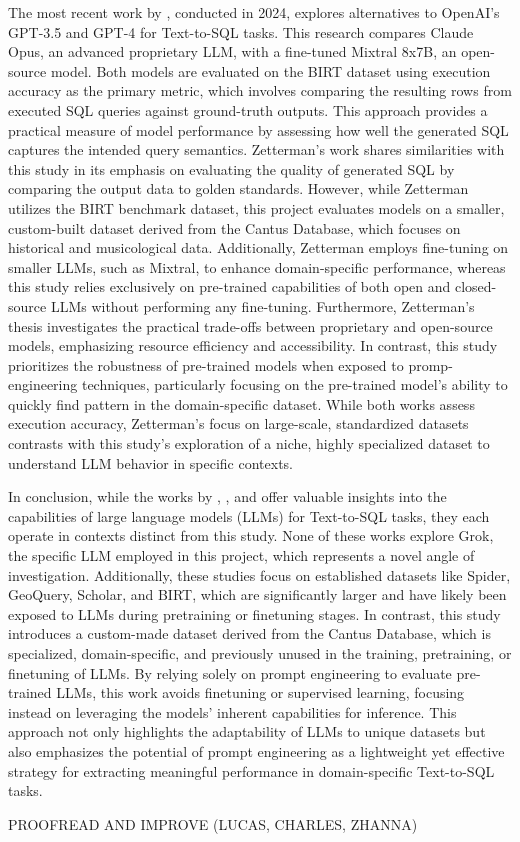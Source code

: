The most recent work by \cite{zetterman2024text2sql}, conducted in 2024, explores alternatives to OpenAI's GPT-3.5 and GPT-4 for Text-to-SQL tasks. This research compares Claude Opus, an advanced proprietary LLM, with a fine-tuned Mixtral 8x7B, an open-source model. Both models are evaluated on the BIRT dataset using execution accuracy as the primary metric, which involves comparing the resulting rows from executed SQL queries against ground-truth outputs. This approach provides a practical measure of model performance by assessing how well the generated SQL captures the intended query semantics. Zetterman’s work shares similarities with this study in its emphasis on evaluating the quality of generated SQL by comparing the output data to golden standards. However, while Zetterman utilizes the BIRT benchmark dataset, this project evaluates models on a smaller, custom-built dataset derived from the Cantus Database, which focuses on historical and musicological data. Additionally, Zetterman employs fine-tuning on smaller LLMs, such as Mixtral, to enhance domain-specific performance, whereas this study relies exclusively on pre-trained capabilities of both open and closed-source LLMs without performing any fine-tuning. Furthermore, Zetterman’s thesis investigates the practical trade-offs between proprietary and open-source models, emphasizing resource efficiency and accessibility. In contrast, this study prioritizes the robustness of pre-trained models when exposed to promp-engineering techniques, particularly focusing on the pre-trained model's ability to quickly find pattern in the domain-specific dataset. While both works assess execution accuracy, Zetterman’s focus on large-scale, standardized datasets contrasts with this study’s exploration of a niche, highly specialized dataset to understand LLM behavior in specific contexts.


In conclusion, while the works by \cite{rajkumar2022texttosql}, \cite{gao2023text2sql}, and \cite{zetterman2024text2sql} offer valuable insights into the capabilities of large language models (LLMs) for Text-to-SQL tasks, they each operate in contexts distinct from this study. None of these works explore Grok, the specific LLM employed in this project, which represents a novel angle of investigation. Additionally, these studies focus on established datasets like Spider, GeoQuery, Scholar, and BIRT, which are significantly larger and have likely been exposed to LLMs during pretraining or finetuning stages. In contrast, this study introduces a custom-made dataset derived from the Cantus Database, which is specialized, domain-specific, and previously unused in the training, pretraining, or finetuning of LLMs. By relying solely on prompt engineering to evaluate pre-trained LLMs, this work avoids finetuning or supervised learning, focusing instead on leveraging the models' inherent capabilities for inference. This approach not only highlights the adaptability of LLMs to unique datasets but also emphasizes the potential of prompt engineering as a lightweight yet effective strategy for extracting meaningful performance in domain-specific Text-to-SQL tasks.

PROOFREAD AND IMPROVE (LUCAS, CHARLES, ZHANNA)